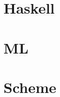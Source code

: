 \documentclass[12pt]{article}
\begin{document}
\section{Haskell}

\section{ML}




\section{Scheme}




\end{document}
